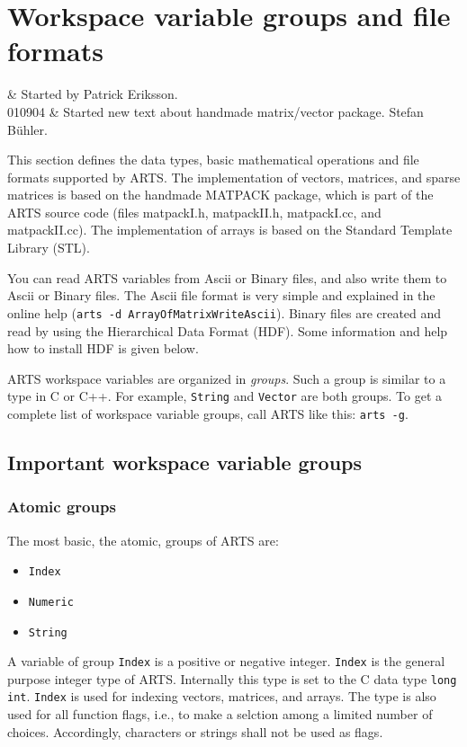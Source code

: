 
\chapter{Workspace variable groups and file formats}
 \label{sec:formats}
 
 & Started by Patrick Eriksson. \\
  010904 & Started new text about handmade matrix/vector package. Stefan B\"uhler.\\
\stophistory

This section defines the data types, basic mathematical operations
and file formats supported by ARTS. The implementation of vectors,
matrices, and sparse matrices is based on the handmade MATPACK
package, which is part of the ARTS source code (files matpackI.h,
matpackII.h, matpackI.cc, and matpackII.cc). The implementation of
arrays is based on the Standard Template Library (STL).

You can read ARTS variables from Ascii or Binary files, and also
write them to Ascii or Binary files. The Ascii file format is very
simple and explained in the online help %
(\verb|arts -d ArrayOfMatrixWriteAscii|).  Binary files are created
and read by using the Hierarchical Data Format (HDF). Some
information and help how to install HDF is given below.

ARTS workspace variables are organized in \emph{groups}. Such a group
is similar to a type in C or C++. For example, \verb|String| and
\verb|Vector| are both groups. To get a complete list of workspace
variable groups, call ARTS like this: \verb|arts -g|.

\section{Important workspace variable groups}
 \label{sec:formats:datatypes}

\subsection{Atomic groups}
\label{sec:formats:atomic}
 
The most basic, the atomic, groups of ARTS are:

\begin{itemize}
\item \verb|Index|
\item \verb|Numeric|
\item \verb|String|
\end{itemize}
A variable of group \verb|Index| is a positive or negative integer.
\verb|Index| is the general purpose integer type of ARTS.  Internally
this type is set to the C data type \verb|long int|. \verb|Index| is
used for indexing vectors, matrices, and arrays. The type is also used
for all function flags, i.e., to make a selction among a limited number
of choices. Accordingly, characters or strings shall not be used as
flags.

